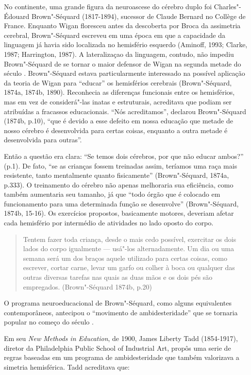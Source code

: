 No continente, uma grande figura da neuroascese do cérebro duplo foi
Charles"-Édouard Brown"-Séquard (1817-1894), sucessor de Claude Bernard no
Collège de France. Enquanto Wigan floresceu antes da descoberta por
Broca da assimetria cerebral, Brown"-Séquard escreveu em uma época em que
a capacidade da linguagem já havia sido localizada no hemisfério
esquerdo (Aminoff, 1993; Clarke, 1987; Harrington, 1987). A
lateralizaçao da linguagem, contudo, não impediu Brown"-Séquard de se
tornar o maior defensor de Wigan na segunda metade do século .
Brown"-Séquard estava particularmente interessado na possível aplicação
da teoria de Wigan para ``educar'' os hemisférios cerebrais
(Brown"-Séquard, 1874a, 1874b, 1890). Reconhecia as diferenças funcionais
entre os hemisférios, mas em vez de considerá"-las inatas e estruturais,
acreditava que podiam ser atribuídas a fracassos educacionais. ``Nós
acreditamos'', declarou Brown"-Séquard (1874b, p.10), ``que é devido a
esse defeito em nossa educação que metade de nosso cérebro é
desenvolvida para certas coisas, enquanto a outra metade é desenvolvida
para outras''.

Então a questão era clara: ``Se temos dois cérebros, por que não educar
ambos?'' (p.1). De fato, ``se as crianças fossem treinadas assim,
teríamos uma raça mais resistente, tanto mentalmente quanto
fisicamente'' (Brown"-Séquard, 1874a, p.333). O treinamento do cérebro
não apenas melhoraria sua eficiência, como também aumentaria seu
tamanho, já que ``todo órgão que é colocado em funcionamento para uma
determinada função se desenvolve'' (Brown"-Séquard, 1874b, 15-16). Os
exercícios propostos, basicamente motores, deveriam afetar cada
hemisfério por intermédio de atividades no lado oposto do corpo.

\begin{quote}
Tentem fazer toda criança, desde o mais cedo possível, exercitar os dois
lados do corpo igualmente --- usá"-los alternadamente. Um dia ou uma
semana será um dos braços aquele utilizado para certas coisas, como
escrever, cortar carne, levar um garfo ou colher à boca ou qualquer das
outras diversas tarefas nas quais as duas mãos e os dois pés são
empregados. (Brown"-Séquard 1874b, p.20)
\end{quote}

O programa neuroeducacional de Brown"-Séquard, como alguns equivalentes
contemporâneos, antecipou o ``movimento de ambidesteridade'' que se
tornaria popular no começo do século .

Em seu \emph{New Methods in Education}, de 1900, James Liberty Tadd
(1854-1917), diretor da Philadelphia Public School of Industrial Art,
propôs uma serie de regras baseadas em um programa de ambidesteridade
que também valorizava a simetria hemisférica. Tadd acreditava que:

